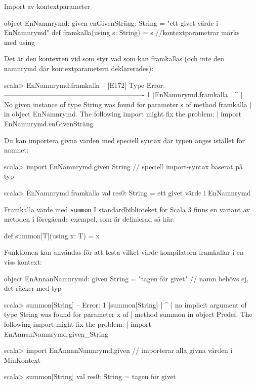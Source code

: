 \begin{Slide}{Import av kontextparameter}\SlideFontTiny
\begin{Code}
object EnNamnrymd:
  given enGivenSträng: String = "ett givet värde i EnNamnrymd"
  def framkalla(using s: String) = s     //kontextparametrar märks med using
\end{Code}
Det är den  kontexten vid  som styr vad som kan framkallas (och inte den namnrymd där kontextparametern deklarerades):
\begin{REPLsmall}
scala> EnNamnrymd.framkalla
-- [E172] Type Error: -------------------------------------------------------------
1 |EnNamnrymd.framkalla
  |                    ^
  | No given instance of type String was found for parameter s of method framkalla 
  | in object EnNamnrymd. The following import might fix the problem:
  | import EnNamnrymd.enGivenSträng
\end{REPLsmall}
Du kan importera givna värden med speciell syntax där typen anges istället för namnet:
\begin{REPLsmall}
scala> import EnNamnrymd.given String    // speciell import-syntax baserat på typ

scala> EnNamnrymd.framkalla
val res0: String = ett givet värde i EnNamnrymd
\end{REPLsmall}
\end{Slide}

\begin{Slide}{Framkalla värde med \texttt{summon}}\SlideFontSmall
I standardbiblioteket för Scala 3 finns en  variant av metoden  i föregående exempel, som är definierad så här:
\begin{Code}
def summon[T](using x: T) = x 
\end{Code}
Funktionen  kan användas för att testa vilket värde kompilatorn framkallar i en viss kontext:
\begin{Code}
object EnAnnanNamnrymd:
  given String = "tagen för givet"    // namn behövs ej, det räcker med typ
\end{Code}
\ifkompendium\else
\vspace{-0.8em}
\fi
\begin{REPLsmall}
scala> summon[String]
-- Error:
1 |summon[String]
  |              ^
  | no implicit argument of type String was found for parameter x of 
  | method summon in object Predef. The following import might fix the problem:
  | import EnAnnanNamnrymd.given_String

scala> import EnAnnanNamnrymd.given    // importerar alla givna värden i MinKontext

scala> summon[String]
val res0: String = tagen för givet
\end{REPLsmall}
\end{Slide}

